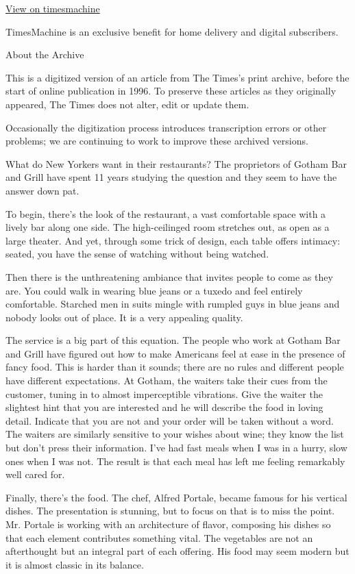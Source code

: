 \href{http://timesmachine.nytimes3xbfgragh.onion/timesmachine/1996/02/23/063177.html}{View
on timesmachine}

TimesMachine is an exclusive benefit for home delivery and digital
subscribers.

About the Archive

This is a digitized version of an article from The Times's print
archive, before the start of online publication in 1996. To preserve
these articles as they originally appeared, The Times does not alter,
edit or update them.

Occasionally the digitization process introduces transcription errors or
other problems; we are continuing to work to improve these archived
versions.

What do New Yorkers want in their restaurants? The proprietors of Gotham
Bar and Grill have spent 11 years studying the question and they seem to
have the answer down pat.

To begin, there's the look of the restaurant, a vast comfortable space
with a lively bar along one side. The high-ceilinged room stretches out,
as open as a large theater. And yet, through some trick of design, each
table offers intimacy: seated, you have the sense of watching without
being watched.

Then there is the unthreatening ambiance that invites people to come as
they are. You could walk in wearing blue jeans or a tuxedo and feel
entirely comfortable. Starched men in suits mingle with rumpled guys in
blue jeans and nobody looks out of place. It is a very appealing
quality.

The service is a big part of this equation. The people who work at
Gotham Bar and Grill have figured out how to make Americans feel at ease
in the presence of fancy food. This is harder than it sounds; there are
no rules and different people have different expectations. At Gotham,
the waiters take their cues from the customer, tuning in to almost
imperceptible vibrations. Give the waiter the slightest hint that you
are interested and he will describe the food in loving detail. Indicate
that you are not and your order will be taken without a word. The
waiters are similarly sensitive to your wishes about wine; they know the
list but don't press their information. I've had fast meals when I was
in a hurry, slow ones when I was not. The result is that each meal has
left me feeling remarkably well cared for.

Finally, there's the food. The chef, Alfred Portale, became famous for
his vertical dishes. The presentation is stunning, but to focus on that
is to miss the point. Mr. Portale is working with an architecture of
flavor, composing his dishes so that each element contributes something
vital. The vegetables are not an afterthought but an integral part of
each offering. His food may seem modern but it is almost classic in its
balance.

